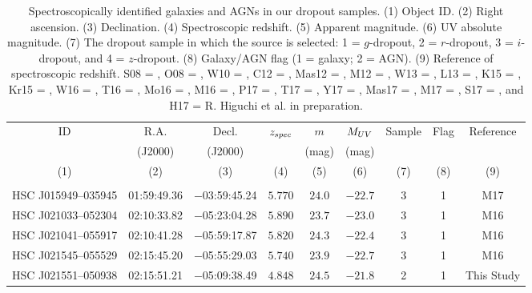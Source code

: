 \documentclass[]{pasj01}
\begin{document}
{\footnotesize
\begin{longtable}{ccccccccc}
  \caption{
  Spectroscopically identified galaxies and AGNs in our dropout samples. 
  (1) Object ID. (2) Right ascension. (3) Declination. 
  (4) Spectroscopic redshift. 
  (5) Apparent magnitude. 
  (6) UV absolute magnitude. 
  (7) The dropout sample in which the source is selected: 
  1 = $g$-dropout, 2 = $r$-dropout, 3 = $i$-dropout, and 4 = $z$-dropout. 
  (8) Galaxy/AGN flag (1 = galaxy; 2 = AGN). 
  (9) Reference of spectroscopic redshift. 
  S08 = \citet{2008ApJ...675.1076S}, 
  O08 = \citet{2008ApJS..176..301O}, 
  W10 = \citet{2010AJ....140..546W}, 
  C12 = \citet{2012MNRAS.422.1425C}, 
  Mas12 = \citet{2012ApJ...755..169M}, 
  M12 = \citet{2012ApJ...760..128M}, 
  W13 = \citet{2013AJ....145....4W}, 
  L13 = \citet{2013A&A...559A..14L}, 
  K15 = \citet{2015ApJ...798...28K}, 
  Kr15 = \citet{2015ApJS..218...15K}, 
  W16 = \citet{2016ApJ...819...24W}, 
  T16 = \citet{2016ApJ...826..114T}, 
  Mo16 = \citet{2016ApJS..225...27M}, 
  M16 = \citet{2016ApJ...828...26M}, 
  P17 = \citet{2017A&A...597A..79P}, 
  T17 = \citet{2017A&A...600A.110T}, 
  Y17 = \citet{2017AJ....153..184Y}, 
  Mas17 = \citet{2017ApJ...841..111M}, 
  M17 = \citet{2017arXiv170405854M}, 
  S17 = \citet{2017arXiv170500733S}, 
  and 
  H17 = R. Higuchi et al. in preparation.  
  }\label{tab:spectroscopy_identifications}
  \hline
  ID & R.A. & Decl. & $z_{\rm spec}$ & $m$ & $M_{\rm UV}$ & Sample & Flag & Reference \\
   & (J2000) & (J2000) &  & (mag) & (mag) &  &  & \\
   (1) & (2) & (3) & (4) & (5) & (6) & (7) & (8) & (9) \\   
\hline
\endhead
  \hline
\endfoot
  \hline
\endlastfoot
  \hline
    \multicolumn{9}{c}{Galaxies} \\
HSC J015949--035945 & 01:59:49.36 & $-$03:59:45.24 & $5.770$ & $24.0$ & $-22.7$ & 3 & 1 & M17 \\
HSC J021033--052304 & 02:10:33.82 & $-$05:23:04.28 & $5.890$ & $23.7$ & $-23.0$ & 3 & 1 & M16 \\
HSC J021041--055917 & 02:10:41.28 & $-$05:59:17.87 & $5.820$ & $24.3$ & $-22.4$ & 3 & 1 & M16 \\
HSC J021545--055529 & 02:15:45.20 & $-$05:55:29.03 & $5.740$ & $23.9$ & $-22.7$ & 3 & 1 & M16 \\
HSC J021551--050938 & 02:15:51.21 & $-$05:09:38.49 & $4.848$ & $24.5$ & $-21.8$ & 2 & 1 & This Study \\

\end{longtable}}
\end{document}
